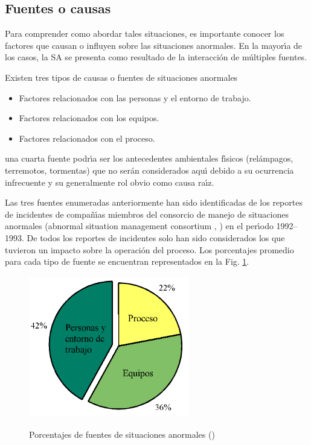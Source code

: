 \subsection{Fuentes o causas}\label{sec_fuentes}
Para comprender como abordar tales situaciones, es importante conocer los factores que causan o influyen
sobre las situaciones anormales. En la mayor{\'\i}a de los casos, la SA se presenta como resultado de la
interacci{\'o}n de m{\'u}ltiples fuentes.

Existen tres tipos de causas o fuentes de situaciones anormales
\begin{itemize}
    \item[A.] Factores relacionados con las personas y el entorno de trabajo.
    \item[B.] Factores relacionados con los equipos.
    \item[C.] Factores relacionados con el proceso.
\end{itemize}
una cuarta fuente podr{\'\i}a ser los antecedentes ambientales f{\'\i}sicos (rel{\'a}mpagos, terremotos, tormentas) que no
ser{\'a}n considerados aqu{\'\i} debido a su ocurrencia infrecuente y su generalmente rol obvio como causa ra{\'\i}z.

Las tres fuentes enumeradas anteriormente han sido identificadas de los reportes de incidentes de compa{\~n}{\'\i}as
miembros del consorcio de manejo de situaciones anormales (abnormal situation management consortium ,
\cite{ASM}\textcolor{myblue}{\circledR}) en el per{\'\i}odo 1992--1993. De todos los reportes de incidentes solo
han sido considerados los que tuvieron un impacto sobre la operaci{\'o}n del proceso. Los porcentajes promedio
para cada tipo de fuente se encuentran representados en la Fig. \ref{f0_1}.
\begin{figure}[t]
  \centering
  \includegraphics[width=7cm,height=6.2cm]{Ch0/f0_1}\\
  \caption{Porcentajes de fuentes de situaciones anormales (\cite{ASM}\textcolor{myblue}{\circledR})}\label{f0_1}
\end{figure}

